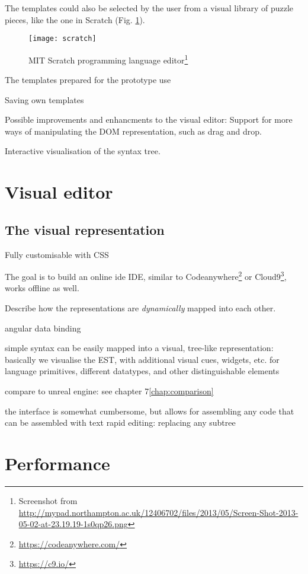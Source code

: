 The templates could also be selected by the user from a visual library of puzzle pieces, like the one in Scratch (Fig. \ref{fig:scratch}).
\begin{figure}[h!]
\centering
\texttt{[image: scratch]}
\caption{MIT Scratch programming language editor\footnote{Screenshot from  \url{
http://mypad.northampton.ac.uk/12406702/files/2013/05/Screen-Shot-2013-05-02-at-23.19.19-1s0qp26.png}}}
\label{fig:scratch}
\end{figure}

The templates prepared for the prototype use 

Saving own templates

Possible improvements and enhancments to the visual editor:
Support for more ways of manipulating the DOM representation, such as drag and drop.

Interactive visualisation of the syntax tree.


\section{Visual editor}
\subsection{The visual representation}
Fully customisable with CSS

The goal is to build an online \acrlong{ide} IDE, similar to Codeanywhere\footnote{\url{https://codeanywhere.com/}} or Cloud9\footnote{\url{https://c9.io/}}, works offline as well.



Describe how the representations are \textit{dynamically} mapped into each other. 

angular
data binding

simple syntax can be easily mapped into a visual, tree-like representation:
basically we visualise the EST, with additional visual cues, widgets, etc. for language primitives, different datatypes, and other distinguishable elements

compare to unreal engine:
see chapter 7\ref{chap:comparison}

the interface is somewhat cumbersome, but allows for assembling any code that can be assembled with text
rapid editing: replacing any subtree

\section{Performance}

